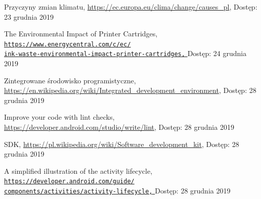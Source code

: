 \documentclass[a4paper,12pt, twoside]{article}
\begin{document}
     	\begingroup
    	\renewcommand{\section}[2]{}
    	\begin{thebibliography}{}
    		
    		Przyczyny zmian klimatu,
    		\newline\url{https://ec.europa.eu/clima/change/causes\_pl}, 
    		\newline Dostęp: 23 grudnia 2019
    		
    		The Environmental Impact of Printer Cartridges,
    		\newline\href{https://www.energycentral.com/c/ec/ink-waste-environmental-impact-printer-cartridges}
    		 {\nolinkurl{https://www.energycentral.com/c/ec/}
                 \\
                  \nolinkurl{ink-waste-environmental-impact-printer-cartridges,}
                 }
    		\newline Dostęp: 24 grudnia 2019
    		
    		Zintegrowane środowisko programistyczne,
    		\newline\url{https://en.wikipedia.org/wiki/Integrated_development_environment}, 
    		\newline Dostęp: 28 grudnia 2019
    		
    		Improve your code with lint checks,
    		\newline\url{https://developer.android.com/studio/write/lint}, 
    		\newline Dostęp: 28 grudnia 2019
    		
    		SDK,
    		\newline\url{https://pl.wikipedia.org/wiki/Software_development_kit}, 
    		\newline Dostęp: 28 grudnia 2019
    		
    		A simplified illustration of the activity lifecycle,
    		\newline\href{https://developer.android.com/guide/components/activities/activity-lifecycle}
    		 {\nolinkurl{https://developer.android.com/guide/}
                 \\
                  \nolinkurl{components/activities/activity-lifecycle,}
                 }
    		\newline Dostęp: 28 grudnia 2019
    

\end{thebibliography}
\end{document}
